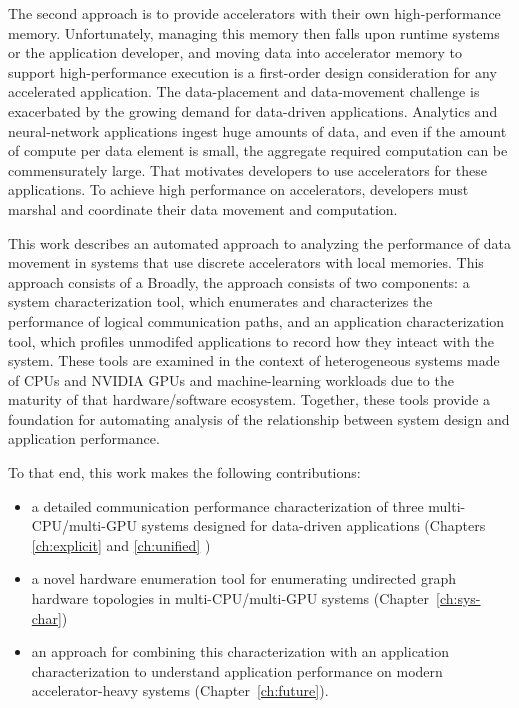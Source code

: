 
The second approach is to provide accelerators with their own high-performance memory.
Unfortunately, managing this memory then falls upon runtime systems or the application developer, and moving data into accelerator memory to support high-performance execution is a first-order design consideration for any accelerated application.
The data-placement and data-movement challenge is exacerbated by the growing demand for data-driven applications.
Analytics and neural-network applications ingest huge amounts of data, and even if the amount of compute per data element is small, the aggregate required computation can be commensurately large.
That motivates developers to use accelerators for these applications.
To achieve high performance on accelerators, developers must marshal and coordinate their data movement and computation.

This work describes an automated approach to analyzing the performance of data movement in systems that use discrete accelerators with local memories.
This approach consists of a
Broadly, the approach consists of two components: a system characterization tool, which enumerates and characterizes the performance of logical communication paths, and an application characterization tool, which profiles unmodifed applications to record how they inteact with the system.
These tools are examined in the context of heterogeneous systems made of CPUs and NVIDIA GPUs and machine-learning workloads due to the maturity of that hardware/software ecosystem.
Together, these tools provide a foundation for automating analysis of the relationship between system design and application performance.

To that end, this work makes the following contributions:
\begin{itemize}
 \item a detailed communication performance characterization of three multi-CPU/multi-GPU systems designed for data-driven applications (Chapters \ref{ch:explicit} and \ref{ch:unified} )
 \item a novel hardware enumeration tool for enumerating undirected graph hardware topologies in multi-CPU/multi-GPU systems (Chapter~\ref{ch:sys-char})
 \item an approach for combining this characterization with an application characterization to understand application performance on modern accelerator-heavy systems (Chapter~\ref{ch:future}).
\end{itemize}

